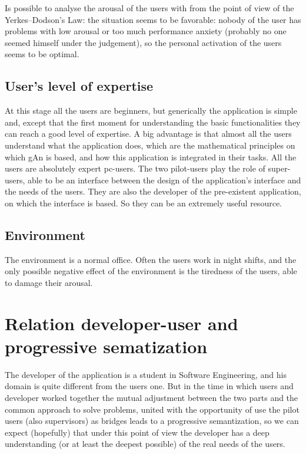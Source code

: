 Is possible to analyse the arousal of the users with from the point of view of the Yerkes–Dodson's Law: the situation seems to be favorable: nobody of the user 
has problems with low arousal or too much performance anxiety (probably no one seemed himself under the judgement), so the personal activation of the users seems to be optimal.

\subsection{User's level of expertise }
At this stage all the users are beginners, but generically the application is simple and, except that the first moment for understanding the basic functionalities they can reach a good level of expertise. A big advantage is that almost all the users understand what the application does, which are the mathematical principles on which gAn is based, and how this application is integrated in their tasks.   
All the users are absolutely expert pc-users.
The two pilot-users play the role of super-users, able to be an interface between the design of the application's interface and the needs of the users. They are also the developer of the pre-existent application, on which the interface is based. So they can be an extremely useful resource.  


\subsection{Environment}
The environment is a normal office. Often the users work in night shifts, and the only possible negative effect of the environment is the tiredness of the users, able to damage their arousal. 

\section{Relation developer-user and progressive sematization}
The developer of the application is a student in Software Engineering, and his domain is quite different from the users one. But in the time in which users and developer worked together the mutual adjustment between the two parts and the common approach to solve problems, united with the opportunity of use the pilot users (also supervisors) as bridges leads to a progressive semantization, so we can expect (hopefully) that under this point of view the developer has a deep understanding (or at least the deepest possible) of the real needs of the users.

